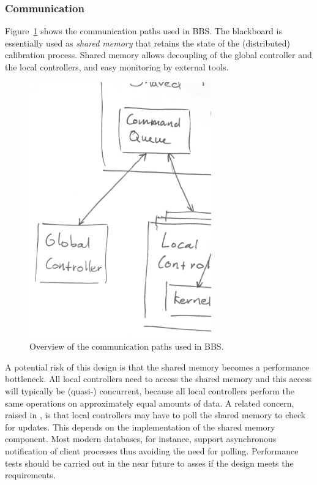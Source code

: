 \documentclass[10pt]{lofar}
\newcommand{\bbs}{BBS\xspace}
\begin{document}
\subsubsection{Communication}
\label{subsubsec:distribution-communication}

Figure~\ref{fig:distribution-communication} shows the communication paths used
in \bbs. The blackboard is essentially used as \emph{shared memory} that retains
the state of the (distributed) calibration process. Shared memory allows
decoupling of the global controller and the local controllers, and easy
monitoring by external tools.

\begin{figure}[htb!]
\centering
\includegraphics[width=0.7\textwidth]{images/communication.ps}
\caption{Overview of the communication paths used in \bbs.}
\label{fig:distribution-communication}
\end{figure}

A potential risk of this design is that the shared memory becomes a performance
bottleneck.  All local controllers need to access the shared memory and this
access will typically be (quasi-) concurrent, because all local controllers
perform the same operations on approximately equal amounts of data. A related
concern, raised in \cite[p.19]{LOFAR-ASTRON-SDD-052}, is that local controllers
may have to poll the shared memory to check for updates. This depends on the
implementation of the shared memory component. Most modern databases, for
instance, support asynchronous notification of client processes thus avoiding
the need for polling. Performance tests should be carried out in the near future
to asses if the design meets the requirements.
\end{document}
